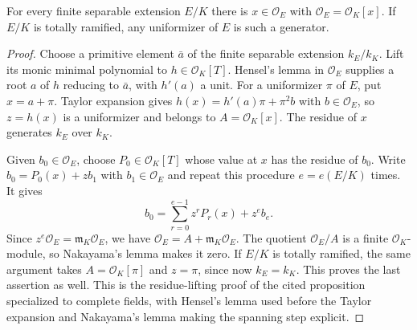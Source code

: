 \begin{lemma}
\label{fw:integral-generator}
\leanok
For every finite separable extension $E/K$ there is $x\in\mathcal O_E$ with
$\mathcal O_E=\mathcal O_K[x]$. If $E/K$ is totally ramified, any
uniformizer of $E$ is such a generator.
\end{lemma}
\begin{proof}
Choose a primitive element $\bar a$ of the finite separable extension
$k_E/k_K$. Lift its monic minimal polynomial to
$h\in\mathcal O_K[T]$. Hensel's lemma in $\mathcal O_E$ supplies a root
$a$ of $h$ reducing to $\bar a$, with $h'(a)$ a unit. For a uniformizer
$\pi$ of $E$, put $x=a+\pi$. Taylor expansion gives
$h(x)=h'(a)\pi+\pi^2b$ with $b\in\mathcal O_E$, so $z=h(x)$ is a
uniformizer and belongs to $A=\mathcal O_K[x]$.
The residue of $x$ generates $k_E$ over $k_K$.

Given $b_0\in\mathcal O_E$, choose $P_0\in\mathcal O_K[T]$ whose value
at $x$ has the residue of $b_0$. Write $b_0=P_0(x)+zb_1$ with
$b_1\in\mathcal O_E$ and repeat this procedure $e=e(E/K)$ times. It gives
\[
 b_0=\sum_{r=0}^{e-1}z^rP_r(x)+z^e b_e.
\]
Since $z^e\mathcal O_E=\mathfrak m_K\mathcal O_E$, we have
$\mathcal O_E=A+\mathfrak m_K\mathcal O_E$.
The quotient $\mathcal O_E/A$ is a finite $\mathcal O_K$-module, so
Nakayama's lemma makes it zero. If $E/K$ is totally ramified, the same
argument takes $A=\mathcal O_K[\pi]$ and $z=\pi$, since now
$k_E=k_K$. This proves the last assertion as well.
This is the residue-lifting proof of the cited proposition specialized
to complete fields, with Hensel's lemma used before the Taylor expansion
and Nakayama's lemma making the spanning step explicit.
\end{proof}

